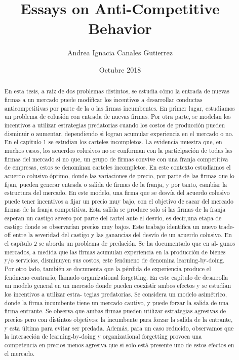 \documentclass[upright, contnum]{umemoria}
\author{Andrea Ignacia Canales Gutierrez}
\title{Essays on Anti-Competitive Behavior}
\date{Octubre 2018}
\begin{document}
\frontmatter
\maketitle

\begin{abstract}
{En esta tesis, a raíz de dos problemas distintos, se estudia cómo la entrada de nuevas firmas a un mercado puede modificar los incentivos a desarrollar conductas anticompetitivas por parte de la o las firmas incumbentes. En primer lugar, estudiamos un problema de colusión con entrada de nuevas firmas. Por otra parte, se modelan los incentivos a utilizar estrategias predatorias cuando los costos de producción pueden disminuir o aumentar, dependiendo si logran acumular experiencia en el mercado o no.
En el capítulo 1 se estudian los carteles incompletos. La evidencia muestra que, en muchos casos, los acuerdos colusivos no se conforman con la participación de todas las firmas del mercado si no que, un grupo de firmas convive con una franja competitiva de empresas, estos se denominan carteles incompletos. En este contexto estudiamos el acuerdo colusivo óptimo, donde las variaciones de precio, por parte de las firmas que lo fijan, pueden generar entrada o salida de firmas de la franja, y por tanto, cambiar la estructura del mercado. En este modelo, una firma que se desvía del acuerdo colusivo puede tener incentivos a fijar un precio muy bajo, con el objetivo de sacar del mercado firmas de la franja competitiva. Esta salida se produce solo si las firmas de la franja esperan un castigo severo por parte del cartel ante el desvío, es decir,una etapa de castigo donde se observarían precios muy bajos. Este trabajo identifica un nuevo trade-off entre la severidad del castigo y las ganancias del desvío de un acuerdo colusivo.
En el capítulo 2 se aborda un problema de predación. Se ha documentado que en al- gunos mercados, a medida que las firmas acumulan experiencia en la producción de bienes y/o servicios, disminuyen sus costos, este fenómeno de denomina learning-by-doing. Por otro lado, también se documenta que la pérdida de experiencia produce el fenómeno contrario, llamado organizational forgetting. En este capítulo de desarrolla un modelo general en un mercado donde pueden coexistir ambos efectos y se estudian los incentivos a utilizar estra- tegias predatorias. Se considera un modelo asimétrico, donde la firma incumbente tiene un mercado cautivo, y puede forzar la salida de una firma entrante. Se observa que ambas firmas pueden utilizar estrategias agresivas de precios pero con distintos objetivos: la incumbente para forzar la salida de la entrante, y esta última para evitar ser predada. Además, para un caso reducido, observamos que la interacción de learning-by-doing y organizational forgetting provoca una competencia en precios menos agresiva que si solo está presente uno de estos efectos en el mercado.}
\end{abstract}
\end{document}
